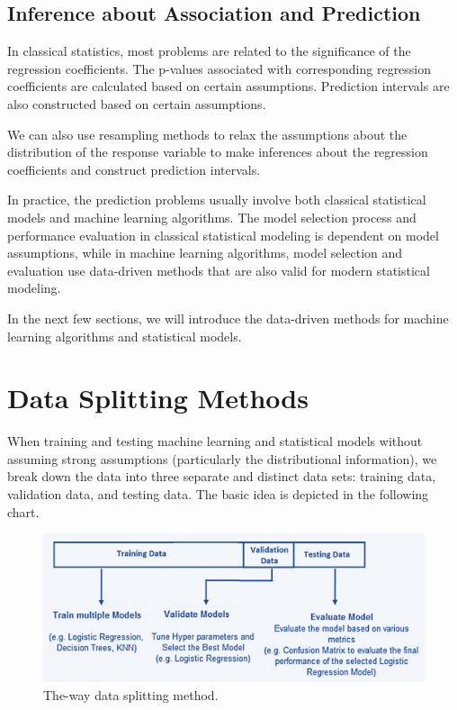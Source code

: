\documentclass[
]{book}
\begin{document}
\hypertarget{inference-about-association-and-prediction}{%
\subsection{Inference about Association and Prediction}\label{inference-about-association-and-prediction}}

In classical statistics, most problems are related to the significance of the regression coefficients. The p-values associated with corresponding regression coefficients are calculated based on certain assumptions. Prediction intervals are also constructed based on certain assumptions.

We can also use resampling methods to relax the assumptions about the distribution of the response variable to make inferences about the regression coefficients and construct prediction intervals.

In practice, the prediction problems usually involve both classical statistical models and machine learning algorithms. The model selection process and performance evaluation in classical statistical modeling is dependent on model assumptions, while in machine learning algorithms, model selection and evaluation use data-driven methods that are also valid for modern statistical modeling.

In the next few sections, we will introduce the data-driven methods for machine learning algorithms and statistical models.

\hypertarget{data-splitting-methods}{%
\section{Data Splitting Methods}\label{data-splitting-methods}}

When training and testing machine learning and statistical models without assuming strong assumptions (particularly the distributional information), we break down the data into three separate and distinct data sets: training data, validation data, and testing data. The basic idea is depicted in the following chart.

\begin{figure}

{\centering \includegraphics[width=0.8\linewidth]{img06/w06-ThreeWaySplitting} 

}

\caption{The-way data splitting method.}\label{fig:unnamed-chunk-118}
\end{figure}
\end{document}
